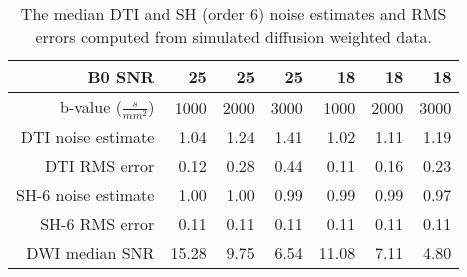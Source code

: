 \begin{longtable}[c]{@{}rrrrrrr@{}}
\caption{The median DTI and SH (order 6) noise estimates and RMS errors computed from simulated diffusion weighted data.}
\label{tabIMsimEstimate}
\toprule
B0 SNR & 25 & 25 & 25 & 18 & 18 & 18\tabularnewline
\midrule
\endhead
b-value (\(\frac{s}{mm^{2}}\)) & 1000 & 2000 & 3000 & 1000 & 2000 &
3000\tabularnewline
DTI noise estimate & 1.04 & 1.24 & 1.41 & 1.02 & 1.11 &
1.19\tabularnewline
DTI RMS error & 0.12 & 0.28 & 0.44 & 0.11 & 0.16 & 0.23\tabularnewline
SH-6 noise estimate & 1.00 & 1.00 & 0.99 & 0.99 & 0.99 &
0.97\tabularnewline
SH-6 RMS error & 0.11 & 0.11 & 0.11 & 0.11 & 0.11 & 0.11\tabularnewline
DWI median SNR & 15.28 & 9.75 & 6.54 & 11.08 & 7.11 & 4.80
\bottomrule

\end{longtable}
